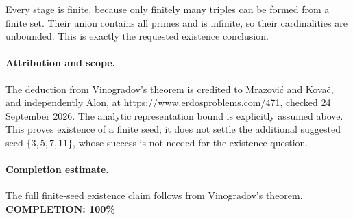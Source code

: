 Every stage is finite, because only finitely many triples can be
formed from a finite set. Their union contains all primes and is
infinite, so their cardinalities are unbounded. This is exactly the
requested existence conclusion.

\paragraph{Attribution and scope.}
The deduction from Vinogradov's theorem is credited to
Mrazovi\'c and Kova\v{c}, and independently Alon, at
\url{https://www.erdosproblems.com/471}, checked 24 September 2026.
The analytic representation bound is explicitly assumed above.
This proves existence of a finite seed; it does not settle the
additional suggested seed \(\{3,5,7,11\}\), whose success is not
needed for the existence question.

\paragraph{Completion estimate.}
The full finite-seed existence claim follows from Vinogradov's theorem.
\textbf{COMPLETION: 100\%}
